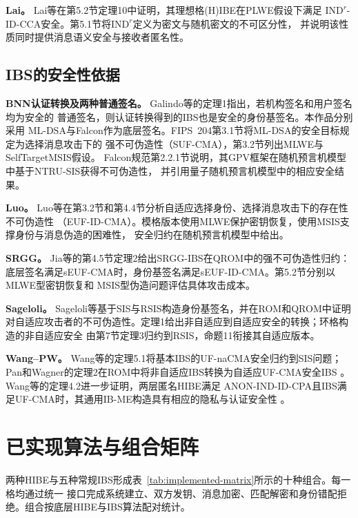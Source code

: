 \textbf{Lai。} Lai等在第5.2节定理10中证明，其理想格(H)IBE在PLWE假设下满足
$\mathrm{IND}^{r}$-ID-CCA安全。第5.1节将$\mathrm{IND}^{r}$定义为密文与随机密文的不可区分性，
并说明该性质同时提供消息语义安全与接收者匿名性\cite{lai2015trapdoors}。

\subsection{IBS的安全性依据}
\textbf{BNN认证转换及两种普通签名。} Galindo等的定理1指出，若机构签名和用户签名均为安全的
普通签名，则认证转换得到的IBS也是安全的身份基签名\cite{galindo2006ibs}。本作品分别采用
ML-DSA与Falcon作为底层签名。FIPS~204第3.1节将ML-DSA的安全目标规定为选择消息攻击下的
强不可伪造性（SUF-CMA），第3.2节列出MLWE与SelfTargetMSIS假设\cite{nist2024fips204}。
Falcon规范第2.2.1节说明，其GPV框架在随机预言机模型中基于NTRU-SIS获得不可伪造性，
并引用量子随机预言机模型中的相应安全结果\cite{falcon2020}。

\textbf{Luo。} Luo等在第3.2节和第4.4节分析自适应选择身份、选择消息攻击下的存在性不可伪造性
（EUF-ID-CMA）。模格版本使用MLWE保护密钥恢复，使用MSIS支撑身份与消息伪造的困难性，
安全归约在随机预言机模型中给出\cite{luo2024ibs}。

\textbf{SRGG。} Jia等的第4.5节定理2给出SRGG-IBS在QROM中的强不可伪造性归约：
底层签名满足sEUF-CMA时，身份基签名满足sEUF-ID-CMA。第5.2节分别以MLWE型密钥恢复和
MSIS型伪造问题评估具体攻击成本\cite{jia2025ibs}。

\textbf{Sageloli。} Sageloli等基于SIS与RSIS构造身份基签名，并在ROM和QROM中证明
对自适应攻击者的不可伪造性。定理1给出非自适应到自适应安全的转换；环格构造的非自适应安全
由第7节定理3归约到RSIS，命题11衔接其自适应版本\cite{sageloli2023ibs}。

\textbf{Wang--PW。} Wang等的定理5.1将基本IBS的UF-naCMA安全归约到SIS问题；
Pan和Wagner的定理2在ROM中将非自适应IBS转换为自适应UF-CMA安全IBS
\cite{wang2024ibme,pan2021ibs}。Wang等的定理4.2进一步证明，两层匿名HIBE满足
ANON-IND-ID-CPA且IBS满足UF-CMA时，其通用IB-ME构造具有相应的隐私与认证安全性
\cite{wang2024ibme}。

\section{已实现算法与组合矩阵}

两种HIBE与五种常规IBS形成表~\ref{tab:implemented-matrix}所示的十种组合。每一格均通过统一
接口完成系统建立、双方发钥、消息加密、匹配解密和身份错配拒绝。组合按底层HIBE与IBS算法配对统计。

